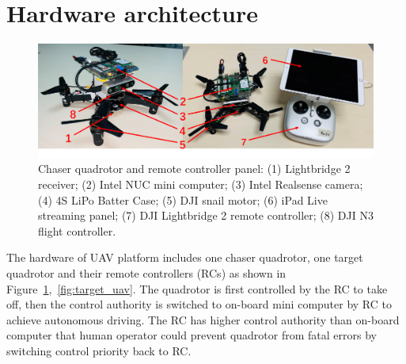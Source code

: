 \section{Hardware architecture}\label{hardware}

\begin{figure}[ht]
  \centering
  \includegraphics[width=1.0\textwidth]{figure/chapter_4/chaser_intro.png}
  \caption{Chaser quadrotor and remote controller panel: (1) Lightbridge 2 receiver; (2) Intel NUC mini computer; (3) Intel Realsense camera; (4) 4S LiPo Batter Case; (5) DJI snail motor; (6) iPad Live streaming panel; (7) DJI Lightbridge 2 remote controller; (8) DJI N3 flight controller.}
  \label{fig:quadrotor_controller}
\end{figure}

The hardware of UAV platform includes one chaser quadrotor, one target quadrotor and their remote controllers (RCs) as shown in Figure~\ref{fig:quadrotor_controller},~\ref{fig:target_uav}. The quadrotor is first controlled by the RC to take off, then the control authority is switched to on-board mini computer by RC to achieve autonomous driving. The RC has higher control authority than on-board computer that human operator could prevent quadrotor from fatal errors by switching control priority back to RC.

